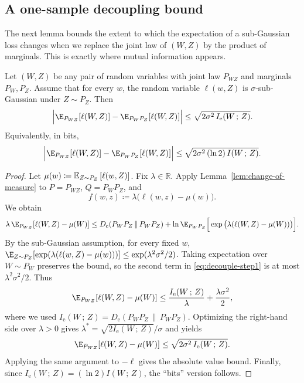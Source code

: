 \documentclass{article}
\numberwithin{equation}{section}
\newcommand{\mathify}[1]{\ifmmode{#1}\else\mbox{$#1$}\fi}
\newcommand{\Esub}[2]{\mathify{\mathbb{E}_{#1}\left[#2\right]}}
\newcommand{\MI}[2]{I\!\left(#1\,;\,#2\right)}
\newcommand{\KLnat}[2]{D_{\mathrm{e}}\!\left(#2\,\middle\|\,#2\right)}
\newcommand{\MInat}[2]{I_{\mathrm{e}}\!\left(#1\,;\,#2\right)}
\newcommand{\field}[1]{\mathbb{#1}}
\newcommand{\fR}{\field{R}} %
\begin{document}
\subsection{A one-sample decoupling bound}

The next lemma bounds the extent to which the expectation of a sub-Gaussian loss changes when we replace the joint law of $(W,Z)$ by the product of marginals.
This is exactly where mutual information appears.

\begin{lemma}
\label{lem:decouple-mi}
Let $(W,Z)$ be any pair of random variables with joint law $P_{WZ}$ and marginals $P_W, P_Z$.
Assume that for every $w$, the random variable $\ell(w,Z)$ is $\sigma$-sub-Gaussian under $Z\sim P_Z$.
Then
\begin{equation}
    \Big|\E_{P_{WZ}}[\ell(W,Z)] - \E_{P_WP_Z}[\ell(W,Z)]\Big|
    \le \sqrt{2\sigma^2\, \MInat{W}{Z}}.
\end{equation}
Equivalently, in bits,
\begin{equation}
    \Big|\E_{P_{WZ}}[\ell(W,Z)] - \E_{P_WP_Z}[\ell(W,Z)]\Big|
    \le \sqrt{2\sigma^2\,(\ln 2)\, \MI{W}{Z}}.
\end{equation}
\end{lemma}
\begin{proof}
Let $\mu(w)\coloneqq \Esub{Z\sim P_Z}{\ell(w,Z)}$.
Fix $\lambda\in\fR$.
Apply Lemma~\ref{lem:change-of-measure} to
\(P=P_{WZ}\), \(Q=P_WP_Z\), and
\begin{equation}
    f(w,z) \coloneqq \lambda\big(\ell(w,z)-\mu(w)\big).
\end{equation}
We obtain
\begin{equation}
\label{eq:decouple-step1}
    \lambda\,\E_{P_{WZ}}[\ell(W,Z)-\mu(W)]
    \le \KLnat{P_{WZ}}{P_WP_Z} + \ln \E_{P_WP_Z}\Big[\exp\big(\lambda(\ell(W,Z)-\mu(W))\big)\Big].
\end{equation}
By the sub-Gaussian assumption, for every fixed $w$,
\(\E_{Z\sim P_Z}[\exp(\lambda(\ell(w,Z)-\mu(w)))] \le \exp(\lambda^2\sigma^2/2)\).
Taking expectation over $W\sim P_W$ preserves the bound, so the second term in \eqref{eq:decouple-step1} is at most $\lambda^2\sigma^2/2$.
Thus
\begin{equation}
\label{eq:decouple-step2}
    \E_{P_{WZ}}[\ell(W,Z)-\mu(W)]
    \le \frac{\MInat{W}{Z}}{\lambda} + \frac{\lambda\sigma^2}{2},
\end{equation}
where we used $\MInat{W}{Z}=\KLnat{P_{WZ}}{P_WP_Z}$.
Optimizing the right-hand side over $\lambda>0$ gives $\lambda^* = \sqrt{2\MInat{W}{Z}}/\sigma$ and yields
\begin{equation}
    \E_{P_{WZ}}[\ell(W,Z)-\mu(W)] \le \sqrt{2\sigma^2\,\MInat{W}{Z}}.
\end{equation}
Applying the same argument to $-\ell$ gives the absolute value bound.
Finally, since $\MInat{W}{Z}=(\ln 2)\MI{W}{Z}$, the ``bits'' version follows.
\end{proof}
\end{document}
